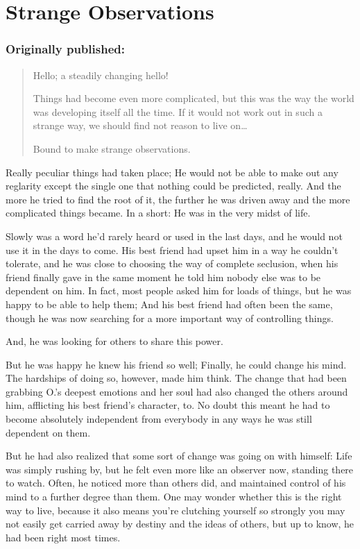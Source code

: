 \chapter{Strange Observations}
\label{cha:strange-observations}
\subsection*{Originally published: }
\begin{quote}
Hello; a steadily changing hello! 

Things had become even more complicated, but this was the way the world was developing itself all the time. If it would not work out in such a strange way, we should find not reason to live on\ldots

Bound to make strange observations.
\end{quote}

Really peculiar things had taken place; He would not be able to make out any reglarity except the single one that nothing could be predicted, really. And the more he tried to find the root of it, the further he was driven away and the more complicated things became. In a short: He was in the very midst of life.

Slowly was a word he'd rarely heard or used in the last days, and he would not use it in the days to come. His best friend had upset him in a way he couldn't tolerate, and he was close to choosing the way of complete seclusion, when his friend finally gave in the same moment he told him nobody else was to be dependent on him. In fact, most people asked him for loads of things, but he was happy to be able to help them; And his best friend had often been the same, though he was now searching for a more important way of controlling things.

And, he was looking for others to share this power.

But he was happy he knew his friend so well; Finally, he could change his mind. The hardships of doing so, however, made him think. The change that had been grabbing O.'s deepest emotions and her soul had also changed the others around him, afflicting his best friend's character, to. No doubt this meant he had to become absolutely independent from everybody in any ways he was still dependent on them.

But he had also realized that some sort of change was going on with himself: Life was simply rushing by, but he felt even more like an observer now, standing there to watch. Often, he noticed more than others did, and maintained control of his mind to a further degree than them. One may wonder whether this is the right way to live, because it also means you're clutching yourself so strongly you may not easily get carried away by destiny and the ideas of others, but up to know, he had been right most times.

